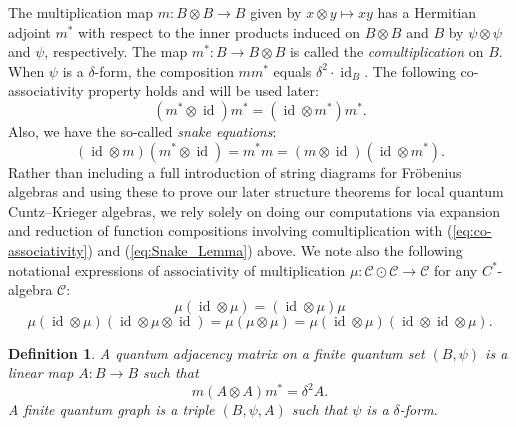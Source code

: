 \documentclass[11pt]{article}
\theoremstyle{plain}
\theoremstyle{nonumberplain}
\theoremstyle{plain}
\newtheorem{definition}[lemma]{Definition}
\theoremstyle{nonumberplain}
\DeclareMathOperator{\id}{id}
\newcommand\1{{\bf 1}}
\newcommand{\<}{\left\langle}
\renewcommand{\>}{\right\rangle}
\begin{document}
The multiplication map $m:B\otimes B\to B$ given by $x\otimes y\mapsto xy$ has a Hermitian adjoint $m^*$ with respect to the inner products induced on $B\otimes B$ and $B$ by $\psi\otimes \psi$ and $\psi$, respectively. The map $m^*:B\to B\otimes B$ is called the {\em comultiplication} on $B$. When $\psi$ is a $\delta$-form, the composition $m  m^*$ equals $ \delta^2 \cdot \id_B.$ The following co-associativity property holds and will be used later:
\begin{equation}\label{eq:co-associativity}
    (m^*\otimes \id)  m^* = (\id \otimes m^*)  m^*.
\end{equation}
Also, we have the so-called {\em snake equations}:
\begin{equation}\label{eq:Snake_Lemma}
    (\id \otimes m)  (m^*\otimes \id) = m^*  m = (m\otimes \id)  (\id \otimes m^*).
\end{equation}
Rather than including a full introduction of string diagrams for Fr\"obenius algebras and using these to prove our later structure theorems for local quantum Cuntz--Krieger algebras, we rely solely on doing our computations via expansion and reduction of function compositions involving comultiplication with (\ref{eq:co-associativity}) and (\ref{eq:Snake_Lemma}) above. We note also the following notational expressions of associativity of multiplication $\mu: \mathcal{C}\odot \mathcal{C}\to \mathcal{C}$ for any $C^*$-algebra $\mathcal{C}$:
\begin{equation}\label{eq:associativity1}
\mu   (\id \otimes \mu) 
= (\id \otimes \mu)  \mu
\end{equation}
\vspace{-.5cm}
\begin{equation}\label{eq:associativity2}
\mu   (\id \otimes \mu)   (\id \otimes \mu \otimes \id) 
= \mu  (\mu \otimes \mu) 
= \mu   (\id \otimes \mu)   (\id \otimes \id\otimes \mu).
\end{equation}


\begin{definition}\label{def:quantum_graph}
    A {\em quantum adjacency matrix} on a finite quantum set $(B,\psi)$ is a linear map $A:B\to B$ such that
\[
m  (A\otimes A)  m^* = \delta^2 A.
\]
A {\em finite quantum graph} is a triple $(B,\psi,A)$ such that $\psi$ is a $\delta$-form.
\end{definition}

\end{document}
